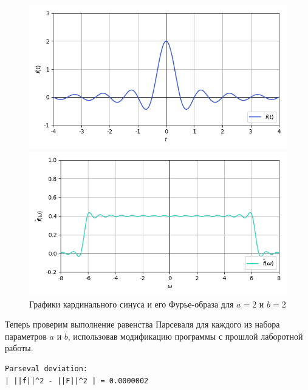 \documentclass[a4paper]{article}
\begin{document}
\begin{figure}[H]
    \begin{minipage}{0.5\textwidth}
        \centering \includegraphics[width=\textwidth]{sources/3_cardinal_sin/graph_3.png}
    \end{minipage}\hfill
    \begin{minipage}{0.5\textwidth}
        \centering \includegraphics[width=\textwidth]{sources/3_cardinal_sin/fourier_3.png}
    \end{minipage}
    \caption{Графики кардинального синуса и его Фурье-образа для $a = 2$ и $b = 2$} 
\end{figure}
\noindent Теперь проверим выполнение равенства Парсеваля для каждого из набора параметров $a$ и $b$, использовав модификацию программы с прошлой лаборотной работы.\\
\begin{minipage}{0.33\textwidth}
\begin{lstlisting}[caption={$a = 1$, $b = 1$}]
Parseval deviation:
| ||f||^2 - ||F||^2 | = 0.0000002
\end{lstlisting}
\end{minipage}\hfill
\end{document}
